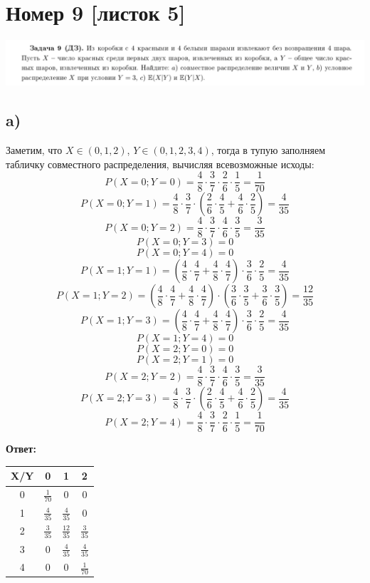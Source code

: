\documentclass[a4paper,12pt]{article}
\begin{document}
\section*{Номер 9 [листок 5]}
\begin{center}
\includegraphics[scale=0.3]{3.png}
\end{center}
\subsection*{a)}
Заметим, что $X \in (0, 1, 2)$, $Y \in (0, 1, 2, 3, 4)$, тогда в тупую заполняем табличку совместного распределения, вычисляя всевозможные исходы:
\[
P(X = 0;Y = 0) = \frac{4}{8} \cdot \frac{3}{7} \cdot \frac{2}{6}  \cdot \frac{1}{5}  = \frac{1}{70}
\]
\[
P(X = 0; Y = 1) = \frac{4}{8} \cdot \frac{3}{7} \cdot \left(
\frac{2}{6} \cdot \frac{4}{5}  +\frac{4}{6} \cdot \frac{2}{5}  
\right) = \frac{4}{35}
\]
\[
P(X = 0; Y = 2) = \frac{4}{8} \cdot \frac{3}{7} \cdot \frac{4}{6} \cdot \frac{3}{5} = \frac{3}{35}
\]
\[
P(X = 0; Y = 3) = 0
\]
\[
P(X = 0; Y = 4) = 0
\]
\[
P(X = 1; Y = 1) = \left(
 \frac{4}{8} \cdot \frac47 + \frac48 \cdot \frac47 
\right)
\cdot 
\frac36 \cdot \frac25 = \frac{4}{35}
\]
\[
P(X = 1; Y = 2) = \left(
 \frac{4}{8} \cdot \frac47 + \frac48 \cdot \frac47 
\right) \cdot \left(
\frac36 \cdot \frac35 + \frac36 \cdot \frac35 
\right) = \frac{12}{35}
\]
\[
P(X = 1; Y = 3) = \left(
 \frac{4}{8} \cdot \frac47 + \frac48 \cdot \frac47 
\right) \cdot \frac36 \cdot \frac25 = \frac{4}{35}
\]
\[
P(X = 1; Y = 4) = 0
\]
\[
P(X = 2; Y = 0) = 0
\]
\[
P(X = 2; Y = 1) = 0
\]
\[
P(X = 2; Y = 2) = \frac{4}{8} \cdot \frac{3}{7} \cdot \frac{4}{6} \cdot \frac{3}{5} = \frac{3}{35}
\]
\[
P(X = 2; Y = 3)  = \frac{4}{8} \cdot \frac{3}{7} \cdot \left(
\frac{2}{6} \cdot \frac{4}{5}  +\frac{4}{6} \cdot \frac{2}{5}  
\right) = \frac{4}{35}
\]
\[
P(X = 2; Y = 4) = 
\frac{4}{8} \cdot \frac{3}{7} \cdot \frac{2}{6}  \cdot \frac{1}{5}  = \frac{1}{70}
\]
\begin{center}
\textbf{Ответ: } 
\end{center}
\begin{center}
\renewcommand{\arraystretch}{1.5}
\renewcommand{\tabcolsep}{0.5cm}
\begin{tabular}{|c|c|c|c|}
\hline
X/Y& 0 & 1 & 2 \\
\hline
$0$ &  $\frac{1}{70}$&  $0$&$0$  \\
\hline
1 & $\frac{4}{35}$ &  $\frac{4}{35}$&  0\\
\hline
2 &$\frac{3}{35}$  &$\frac{12}{35}$  & $\frac{3}{35}$ \\
\hline
3 &  0& $\frac{4}{35}$ & $\frac{4}{35}$ \\
\hline
4 &0  & 0 & $\frac{1}{70}$ \\
\hline
\end{tabular}
\end{center}
\end{document}
